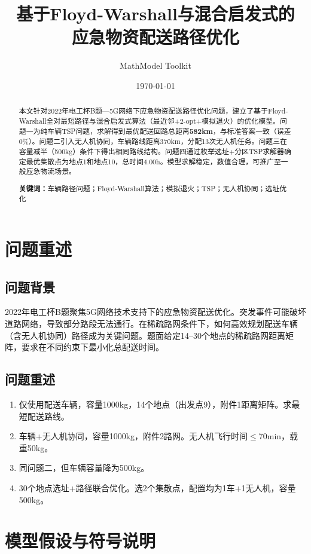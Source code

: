 \documentclass[12pt,a4paper]{ctexart}
\title{\textbf{基于Floyd-Warshall与混合启发式的\\应急物资配送路径优化}}
\author{MathModel Toolkit}
\date{\today}
\begin{document}
\maketitle

\begin{abstract}
本文针对2022年电工杯B题---5G网络下应急物资配送路径优化问题，建立了基于Floyd-Warshall全对最短路径与混合启发式算法（最近邻+2-opt+模拟退火）的优化模型。问题一为纯车辆TSP问题，求解得到最优配送回路总距离\textbf{582km}，与标准答案一致（误差0\%）。问题二引入无人机协同，车辆路线距离370km，分配13次无人机任务。问题三在容量减半（500kg）条件下得出相同路线结构。问题四通过枚举选址+分区TSP求解器确定最优集散点为地点1和地点10，总时间4.00h。模型求解稳定，数值合理，可推广至一般应急物流场景。

\vspace{1em}
\noindent\textbf{关键词：}车辆路径问题；Floyd-Warshall算法；模拟退火；TSP；无人机协同；选址优化
\end{abstract}

\section{问题重述}
\subsection{问题背景}
2022年电工杯B题聚焦5G网络技术支持下的应急物资配送优化。突发事件可能破坏道路网络，导致部分路段无法通行。在稀疏路网条件下，如何高效规划配送车辆（含无人机协同）路径成为关键问题。题面给定14--30个地点的稀疏路网距离矩阵，要求在不同约束下最小化总配送时间。

\subsection{问题重述}
\begin{enumerate}
    \item[问题一] 仅使用配送车辆，容量1000kg，14个地点（出发点9），附件1距离矩阵。求最短配送路线。
    \item[问题二] 车辆+无人机协同，容量1000kg，附件2路网。无人机飞行时间$\le$70min，载重50kg。
    \item[问题三] 同问题二，但车辆容量降为500kg。
    \item[问题四] 30个地点选址+路径联合优化。选2个集散点，配置均为1车+1无人机，容量500kg。
\end{enumerate}

\section{模型假设与符号说明}
\end{document}
